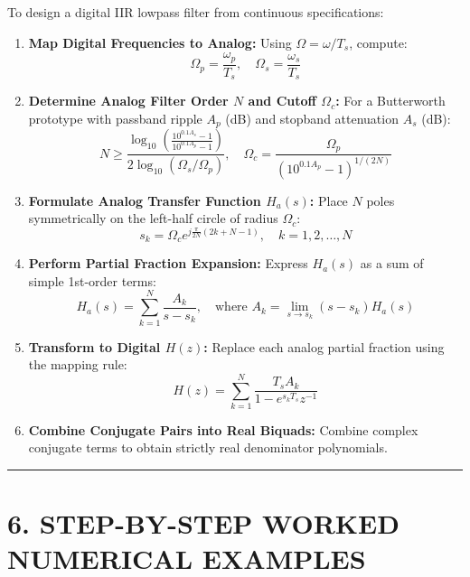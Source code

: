 \documentclass[11pt,a4paper]{article}
\begin{document}
To design a digital IIR lowpass filter from continuous specifications:
\begin{enumerate}
    \item \textbf{Map Digital Frequencies to Analog:} Using $\Omega = \omega / T_s$, compute:
    \begin{equation}
    \Omega_p = \frac{\omega_p}{T_s}, \quad \Omega_s = \frac{\omega_s}{T_s}
    \end{equation}
    \item \textbf{Determine Analog Filter Order $N$ and Cutoff $\Omega_c$:} For a Butterworth prototype with passband ripple $A_p$ (dB) and stopband attenuation $A_s$ (dB):
    \begin{equation}
    N \ge \frac{\log_{10}\left( \frac{10^{0.1 A_s} - 1}{10^{0.1 A_p} - 1} \right)}{2\log_{10}(\Omega_s / \Omega_p)}, \quad \Omega_c = \frac{\Omega_p}{\left(10^{0.1 A_p} - 1\right)^{1/(2N)}}
    \end{equation}
    \item \textbf{Formulate Analog Transfer Function $H_a(s)$:} Place $N$ poles symmetrically on the left-half circle of radius $\Omega_c$:
    \begin{equation}
    s_k = \Omega_c e^{j \frac{\pi}{2N}(2k + N - 1)}, \quad k = 1, 2, \dots, N
    \end{equation}
    \item \textbf{Perform Partial Fraction Expansion:} Express $H_a(s)$ as a sum of simple 1st-order terms:
    \begin{equation}
    H_a(s) = \sum_{k=1}^N \frac{A_k}{s - s_k}, \quad \text{where } A_k = \lim_{s \to s_k} (s - s_k) H_a(s)
    \end{equation}
    \item \textbf{Transform to Digital $H(z)$:} Replace each analog partial fraction using the mapping rule:
    \begin{equation}
    H(z) = \sum_{k=1}^N \frac{T_s A_k}{1 - e^{s_k T_s} z^{-1}}
    \end{equation}
    \item \textbf{Combine Conjugate Pairs into Real Biquads:} Combine complex conjugate terms to obtain strictly real denominator polynomials.
\end{enumerate}

\noindent\rule{\textwidth}{0.5pt}

\section{6. STEP-BY-STEP WORKED NUMERICAL EXAMPLES}
\end{document}
